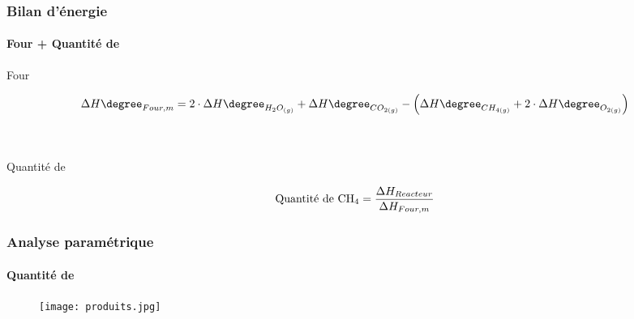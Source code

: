 \documentclass[10pt]{beamer}
\begin{document}
\begin{frame}
\frametitle{Bilan d'énergie}
\framesubtitle{Four + Quantité de }

Four

$$\Delta H\degree_{Four,m} = 2\cdot \Delta H\degree_{H_{2}O_{(g)}} + \Delta H\degree_{CO_{2(g)}}
- \left(\Delta H\degree_{CH_{4(g)}} + 2\cdot \Delta H\degree_{O_{2(g)}}\right)$$

\\
\\

Quantité de 

$$\text{Quantité de \ce{CH_4}} = \dfrac{\Delta H_{Reacteur}}{\Delta H_{Four,m}}$$


\end{frame}




\begin{frame}
\frametitle{Analyse paramétrique}
\framesubtitle{Quantité de }

\begin{figure}[ht!]
\centering
\texttt{[image: produits.jpg]}
\end{figure}


\end{frame}
\end{document}
